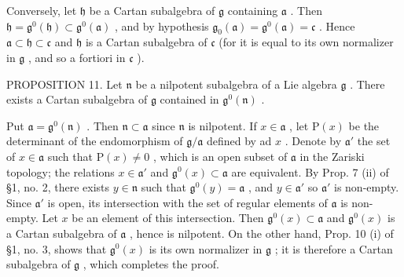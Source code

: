 Conversely, let \(\mathfrak{h}\) be a Cartan subalgebra of \(\mathfrak{g}\) containing \(\mathfrak{a}\) . Then \(\mathfrak{h} = \mathfrak{g}^0 (\mathfrak{h})\subset \mathfrak{g}^0 (\mathfrak{a})\) , and by hypothesis \(\mathfrak{g}_0(\mathfrak{a}) = \mathfrak{g}^0 (\mathfrak{a}) = \mathfrak{c}\) . Hence \(\mathfrak{a}\subset \mathfrak{h}\subset \mathfrak{c}\) and \(\mathfrak{h}\) is a Cartan subalgebra of \(\mathfrak{c}\) (for it is equal to its own normalizer in \(\mathfrak{g}\) , and so a fortiori in \(\mathfrak{c}\) ).

PROPOSITION 11. Let \(\mathfrak{n}\) be a nilpotent subalgebra of a Lie algebra \(\mathfrak{g}\) . There exists a Cartan subalgebra of \(\mathfrak{g}\) contained in \(\mathfrak{g}^0 (\mathfrak{n})\) .

Put \(\mathfrak{a} = \mathfrak{g}^0 (\mathfrak{n})\) . Then \(\mathfrak{n}\subset \mathfrak{a}\) since \(\mathfrak{n}\) is nilpotent. If \(x\in \mathfrak{a}\) , let \(\mathrm{P}(x)\) be the determinant of the endomorphism of \(\mathfrak{g} / \mathfrak{a}\) defined by ad \(x\) . Denote by \(\mathfrak{a}'\) the set of \(x\in \mathfrak{a}\) such that \(\mathrm{P}(x)\neq 0\) , which is an open subset of \(\mathfrak{a}\) in the Zariski topology; the relations \(x\in \mathfrak{a}'\) and \(\mathfrak{g}^0 (x)\subset \mathfrak{a}\) are equivalent. By Prop. 7 (ii) of §1, no. 2, there exists \(y\in \mathfrak{n}\) such that \(\mathfrak{g}^0 (y) = \mathfrak{a}\) , and \(y\in \mathfrak{a}'\) so \(\mathfrak{a}'\) is non-empty. Since \(\mathfrak{a}'\) is open, its intersection with the set of regular elements of \(\mathfrak{a}\) is non-empty. Let \(x\) be an element of this intersection. Then \(\mathfrak{g}^0 (x)\subset \mathfrak{a}\) and \(\mathfrak{g}^0 (x)\) is a Cartan subalgebra of \(\mathfrak{a}\) , hence is nilpotent. On the other hand, Prop. 10 (i) of §1, no. 3, shows that \(\mathfrak{g}^0 (x)\) is its own normalizer in \(\mathfrak{g}\) ; it is therefore a Cartan subalgebra of \(\mathfrak{g}\) , which completes the proof.

